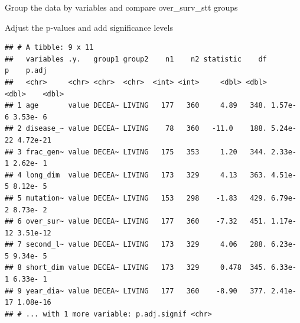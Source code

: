 \documentclass[]{article}
\newenvironment{Shaded}{\begin{snugshade}}{\end{snugshade}}
\newcommand{\KeywordTok}[1]{\textcolor[rgb]{0.13,0.29,0.53}{\textbf{#1}}}
\newcommand{\DataTypeTok}[1]{\textcolor[rgb]{0.13,0.29,0.53}{#1}}
\newcommand{\StringTok}[1]{\textcolor[rgb]{0.31,0.60,0.02}{#1}}
\newcommand{\OperatorTok}[1]{\textcolor[rgb]{0.81,0.36,0.00}{\textbf{#1}}}
\newcommand{\NormalTok}[1]{#1}
\begin{document}
Group the data by variables and compare over\_surv\_stt groups

Adjust the p-values and add significance levels

\begin{Shaded}
\end{Shaded}

\begin{verbatim}
## # A tibble: 9 x 11
##   variables .y.   group1 group2    n1    n2 statistic    df        p    p.adj
##   <chr>     <chr> <chr>  <chr>  <int> <int>     <dbl> <dbl>    <dbl>    <dbl>
## 1 age       value DECEA~ LIVING   177   360     4.89   348. 1.57e- 6 3.53e- 6
## 2 disease_~ value DECEA~ LIVING    78   360   -11.0    188. 5.24e-22 4.72e-21
## 3 frac_gen~ value DECEA~ LIVING   175   353     1.20   344. 2.33e- 1 2.62e- 1
## 4 long_dim  value DECEA~ LIVING   173   329     4.13   363. 4.51e- 5 8.12e- 5
## 5 mutation~ value DECEA~ LIVING   153   298    -1.83   429. 6.79e- 2 8.73e- 2
## 6 over_sur~ value DECEA~ LIVING   177   360    -7.32   451. 1.17e-12 3.51e-12
## 7 second_l~ value DECEA~ LIVING   173   329     4.06   288. 6.23e- 5 9.34e- 5
## 8 short_dim value DECEA~ LIVING   173   329     0.478  345. 6.33e- 1 6.33e- 1
## 9 year_dia~ value DECEA~ LIVING   177   360    -8.90   377. 2.41e-17 1.08e-16
## # ... with 1 more variable: p.adj.signif <chr>
\end{verbatim}
\end{document}
